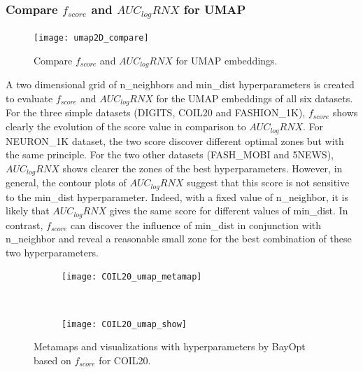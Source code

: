 \subsubsection{Compare $f_{score}$ and $AUC_{log}RNX$ for UMAP}\label{sec:compare:umap}

\begin{figure}%
    \centering
    \texttt{[image: umap2D\_compare]}
    \caption{Compare $f_{score}$ and $AUC_{log}RNX$ for UMAP embeddings.}
    \label{fig:score:umap2D:compare}
\end{figure}

A two dimensional grid of {n\_neighbors} and {min\_dist} hyperparameters is created to evaluate $f_{score}$ and $AUC_{log}RNX$ for the UMAP embeddings of all six datasets.
For the three simple datasets (DIGITS, COIL20 and {FASHION\_1K}), $f_{score}$ shows clearly the evolution of the score value in comparison to $AUC_{log}RNX$.
For {NEURON\_1K} dataset, the two score discover different optimal zones but with the same principle.
For the two other datasets ({FASH\_MOBI} and 5NEWS), $AUC_{log}RNX$ shows clearer the zones of the best hyperparameters.
However, in general, the contour plots of $AUC_{log}RNX$ suggest that this score is not sensitive to the {min\_dist} hyperparameter.
Indeed, with a fixed value of {n\_neighbor}, it is likely that $AUC_{log}RNX$ gives the same score for different values of {min\_dist}.
In contrast, $f_{score}$ can discover the influence of {min\_dist} in conjunction with {n\_neighbor} and reveal a reasonable small zone for the best combination of these two hyperparameters.

\begin{figure}%
    \centering
    \begin{subfigure}[b]{\linewidth}
        \centering
        \texttt{[image: COIL20\_umap\_metamap]}
    \end{subfigure}
    ~
    \begin{subfigure}[b]{\linewidth}
        \texttt{[image: COIL20\_umap\_show]}
    \end{subfigure}
    \caption{Metamaps and visualizations with hyperparameters by BayOpt based on $f_{score}$ for COIL20.}
    \label{fig:umap:meta:COIL20}
\end{figure}

